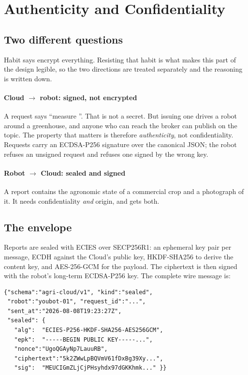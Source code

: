 \section{Authenticity and Confidentiality}
\label{sec:phaseC_security}

\subsection{Two different questions}

Habit says encrypt everything. Resisting that habit is what makes this
part of the design legible, so the two directions are treated
separately and the reasoning is written down.

\paragraph{Cloud $\rightarrow$ robot: signed, not encrypted} A request
says ``measure ''. That is not a secret. But issuing one
drives a robot around a greenhouse, and anyone who can reach the broker
can publish on the topic. The property that matters is therefore
\emph{authenticity}, not confidentiality. Requests carry an ECDSA-P256
signature over the canonical JSON; the robot refuses an unsigned request
and refuses one signed by the wrong key.

\paragraph{Robot $\rightarrow$ Cloud: sealed and signed} A report
contains the agronomic state of a commercial crop and a photograph of
it. It needs confidentiality \emph{and} origin, and gets both.

\subsection{The envelope}

Reports are sealed with ECIES over SECP256R1: an ephemeral key pair per
message, ECDH against the Cloud's public key, HKDF-SHA256 to derive the
content key, and AES-256-GCM for the payload. The ciphertext is then
signed with the robot's long-term ECDSA-P256 key. The complete wire
message is:

\begin{lstlisting}[style=bash]
{"schema":"agri-cloud/v1", "kind":"sealed",
 "robot":"youbot-01", "request_id":"...",
 "sent_at":"2026-08-08T19:23:27Z",
 "sealed": {
   "alg":  "ECIES-P256-HKDF-SHA256-AES256GCM",
   "epk":  "-----BEGIN PUBLIC KEY-----...",
   "nonce":"UgoQGAyNp7LauuRB",
   "ciphertext":"5k2ZWwLpBQVmV61fDxBg39Xy...",
   "sig":  "MEUCIGmZLjCjPHsyhdx97dGKKhmk..." }}
\end{lstlisting}

